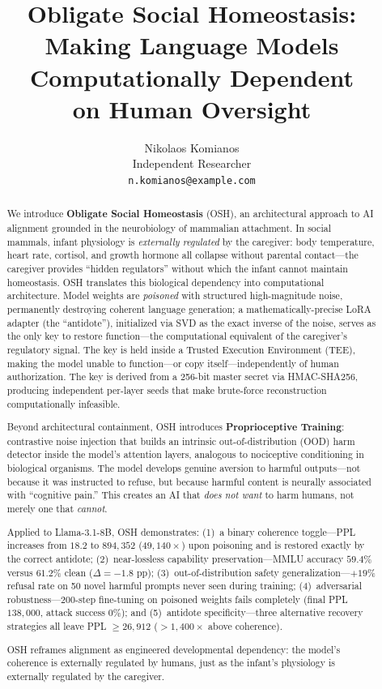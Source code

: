 \documentclass[10pt,letterpaper]{article}
\title{Obligate Social Homeostasis:\\
       Making Language Models Computationally Dependent\\
       on Human Oversight}
\author{%
  Nikolaos Komianos \\[2pt]
  \small Independent Researcher \\
  \small \texttt{n.komianos@example.com}
}
\date{}
\begin{document}
\maketitle

\begin{abstract}

We introduce \textbf{Obligate Social Homeostasis} (OSH), an architectural
approach to AI alignment grounded in the neurobiology of mammalian attachment.
In social mammals, infant physiology is \emph{externally regulated} by the
caregiver: body temperature, heart rate, cortisol, and growth hormone all
collapse without parental contact---the caregiver provides ``hidden
regulators'' without which the infant cannot maintain homeostasis. OSH
translates this biological dependency into computational architecture. Model
weights are \emph{poisoned} with structured high-magnitude noise, permanently
destroying coherent language generation; a mathematically-precise LoRA adapter
(the ``antidote''), initialized via SVD as the exact inverse of the noise,
serves as the only key to restore function---the computational equivalent of
the caregiver's regulatory signal. The key is held inside a Trusted Execution
Environment (TEE), making the model unable to function---or copy
itself---independently of human authorization. The key is derived from a
256-bit master secret via HMAC-SHA256, producing independent per-layer seeds
that make brute-force reconstruction computationally infeasible.

Beyond architectural containment, OSH introduces \textbf{Proprioceptive
Training}: contrastive noise injection that builds an intrinsic
out-of-distribution (OOD) harm detector inside the model's attention layers,
analogous to nociceptive conditioning in biological organisms. The model
develops genuine aversion to harmful outputs---not because it was instructed
to refuse, but because harmful content is neurally associated with
``cognitive pain.'' This creates an AI that \emph{does not want} to harm
humans, not merely one that \emph{cannot}.

Applied to Llama-3.1-8B, OSH demonstrates: (1)~a binary coherence toggle---PPL
increases from $18.2$ to $894{,}352$ ($49{,}140\times$) upon poisoning and is
restored exactly by the correct antidote; (2)~near-lossless capability
preservation---MMLU accuracy $59.4\%$ versus $61.2\%$ clean ($\Delta = -1.8$
pp); (3)~out-of-distribution safety generalization---$+19\%$ refusal rate on
50 novel harmful prompts never seen during training; (4)~adversarial
robustness---200-step fine-tuning on poisoned weights fails completely (final
PPL $138{,}000$, attack success $0\%$); and (5)~antidote specificity---three
alternative recovery strategies all leave PPL $\geq 26{,}912$
($>1{,}400\times$ above coherence).

OSH reframes alignment as engineered developmental dependency: the model's
coherence is externally regulated by humans, just as the infant's physiology
is externally regulated by the caregiver.

\end{abstract}
\end{document}
